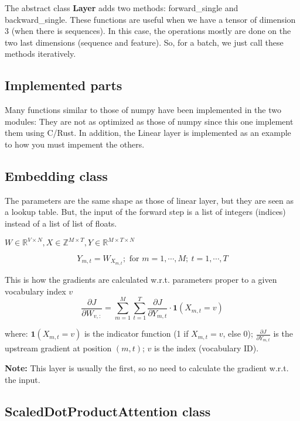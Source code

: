 \documentclass{../../../extra/aakpract/aakpract}
\begin{document}
The abstract class \textbf{Layer} adds two methods: forward\_single and backward\_single. 
These functions are useful when we have a tensor of dimension 3 (when there is sequences).
In this case, the operations mostly are done on the two last dimensions (sequence and feature).
So, for a batch, we just call these methods iteratively.

\subsection{Implemented parts}

Many functions similar to those of numpy have been implemented in the two modules: 
They are not as optimized as those of numpy since this one implement them using C/Rust.
In addition, the Linear layer is implemented as an example to how you must impement the others.

\subsection{Embedding class}

The parameters are the same shape as those of linear layer, but they are seen as a lookup table.
But, the input of the forward step is a list of integers (indices) instead of a list of list of floats.

$W \in \mathbb{R}^{V \times N}, X \in \mathbb{Z}^{M \times T}, Y \in \mathbb{R}^{M \times T \times N} $


\begin{equation}
	Y_{m,t} = W_{X_{m,t}}; \text{ for } m = 1, \cdots, M;\ t = 1, \cdots, T
\end{equation}

This is how the gradients are calculated w.r.t. parameters proper to a given vocabulary index $v$
\begin{equation}
	\frac{\partial J}{\partial W_{v,:}} = \sum_{m=1}^M \sum_{t=1}^T \frac{\partial J}{\partial Y_{m,t}} \cdot \mathbf{1}(X_{m,t} = v)
\end{equation}

where:
$\mathbf{1}(X_{m,t} = v)$ is the indicator function (1 if \( X_{m,t} = v \), else 0);
\( \frac{\partial J}{\partial Y_{m,t}} \) is the upstream gradient at position \((m, t)\); 
\( v \) is the index (vocabulary ID).

\textbf{Note:} This layer is usually the first, so no need to calculate the gradient w.r.t. the input.

\subsection{ScaledDotProductAttention class}
\end{document}
